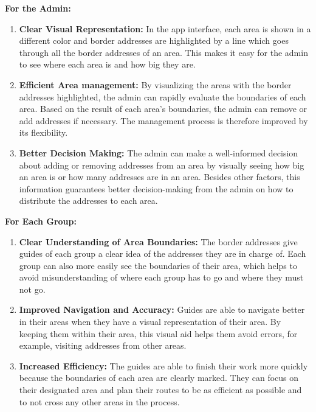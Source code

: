     \pagebreak

    \textbf{For the Admin:}
    \begin{enumerate}
        \item \textbf{Clear Visual Representation:} In the app interface, each area is shown in a different color and border addresses are highlighted by a line which goes through all the border addresses of an area. This makes it easy for the admin to see where each area is and how big they are.
        \item \textbf{Efficient Area management:} By visualizing the areas with the border addresses highlighted, the admin can rapidly evaluate the boundaries of each area. Based on the result of each area's boundaries, the admin can remove or add addresses if necessary. The management process is therefore improved by its flexibility. 
        \item \textbf{Better Decision Making:} The admin can make a well-informed decision about adding or removing addresses from an area by visually seeing how big an area is or how many addresses are in an area. Besides other factors, this information guarantees better decision-making from the admin on how to distribute the addresses to each area.
    \end{enumerate}

    \blankLine

    \textbf{For Each Group:}
    \begin{enumerate}
        \item \textbf{Clear Understanding of Area Boundaries:} The border addresses give guides of each group a clear idea of the addresses they are in charge of. Each group can also more easily see the boundaries of their area, which helps to avoid misunderstanding of where each group has to go and where they must not go.
        \item \textbf{Improved Navigation and Accuracy:} Guides are able to navigate better in their areas when they have a visual representation of their area. By keeping them within their area, this visual aid helps them avoid errors, for example, visiting addresses from other areas. 
        \item \textbf{Increased Efficiency:} The guides are able to finish their work more quickly because the boundaries of each area are clearly marked. They can focus on their designated area and plan their routes to be as efficient as possible and to not cross any other areas in the process.
    \end{enumerate}

